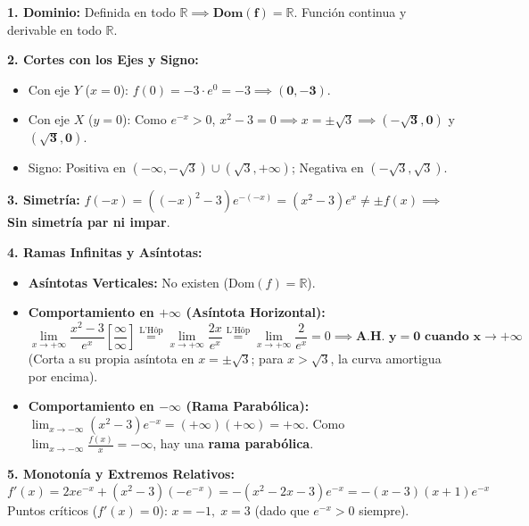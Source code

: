 \documentclass[10pt,a4paper]{article}
\begin{document}
\textbf{1. Dominio:}
Definida en todo $\mathbb{R} \implies \mathbf{\text{Dom}(f) = \mathbb{R}}$. Función continua y derivable en todo $\mathbb{R}$.

\textbf{2. Cortes con los Ejes y Signo:}
\begin{itemize}\itemsep 0pt
    \item Con eje $Y$ ($x = 0$): $f(0) = -3 \cdot e^0 = -3 \implies \mathbf{(0, -3)}$.
    \item Con eje $X$ ($y = 0$): Como $e^{-x} > 0$, $x^2 - 3 = 0 \implies x = \pm\sqrt{3} \implies \mathbf{(-\sqrt{3}, 0)}$ y $\mathbf{(\sqrt{3}, 0)}$.
    \item Signo: Positiva en $(-\infty, -\sqrt{3}) \cup (\sqrt{3}, +\infty)$; \quad Negativa en $(-\sqrt{3}, \sqrt{3})$.
\end{itemize}

\textbf{3. Simetría:}
$f(-x) = ((-x)^2 - 3)e^{-(-x)} = (x^2 - 3)e^x \neq \pm f(x) \implies$ \textbf{Sin simetría par ni impar}.

\textbf{4. Ramas Infinitas y Asíntotas:}
\begin{itemize}\itemsep 0.5pt
    \item \textbf{Asíntotas Verticales:} No existen ($\text{Dom}(f) = \mathbb{R}$).
    \item \textbf{Comportamiento en $+\infty$ (Asíntota Horizontal):}
    $$\lim_{x \to +\infty} \frac{x^2 - 3}{e^x} \left[\frac{\infty}{\infty}\right] \stackrel{\text{L'Hôp}}{=} \lim_{x \to +\infty} \frac{2x}{e^x} \stackrel{\text{L'Hôp}}{=} \lim_{x \to +\infty} \frac{2}{e^x} = 0 \implies \mathbf{\text{A.H. } y = 0 \text{ cuando } x \to +\infty}$$
    (Corta a su propia asíntota en $x = \pm\sqrt{3}$; para $x > \sqrt{3}$, la curva amortigua por encima).
    \item \textbf{Comportamiento en $-\infty$ (Rama Parabólica):}
    $\lim_{x \to -\infty} (x^2 - 3)e^{-x} = (+\infty)(+\infty) = +\infty$. Como $\lim_{x \to -\infty} \frac{f(x)}{x} = -\infty$, hay una \textbf{rama parabólica}.
\end{itemize}

\textbf{5. Monotonía y Extremos Relativos:}
$$f'(x) = 2x e^{-x} + (x^2 - 3)(-e^{-x}) = -(x^2 - 2x - 3) e^{-x} = -(x - 3)(x + 1) e^{-x}$$
Puntos críticos ($f'(x) = 0$): $x = -1, \; x = 3$ (dado que $e^{-x} > 0$ siempre).
\end{document}
